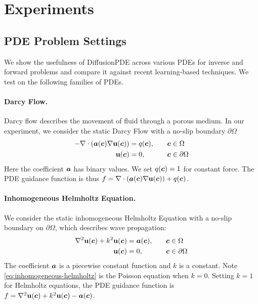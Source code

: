 \section{Experiments}


\subsection{PDE Problem Settings}
\label{sec:exp-forward-inverse}

We show the usefulness of DiffusionPDE across various PDEs for inverse and forward problems and compare it against recent learning-based techniques. We test on the following families of PDEs.

\vspace{-1em}\paragraph{Darcy Flow.} Darcy flow describes the movement of fluid through a porous medium. In our experiment, we consider the static Darcy Flow with a no-slip boundary $\partial\Omega$
\begin{equation}
    \begin{aligned}
        -\nabla\cdot(\boldsymbol{a}(\boldsymbol{c})\nabla \mathbf{u}(\boldsymbol{c}))&=q(\boldsymbol{c}),\quad && \boldsymbol{c}\in\Omega \\
        \mathbf{u}(\boldsymbol{c})&=0, && \boldsymbol{c}\in\partial\Omega
    \end{aligned}
\end{equation}
Here the coefficient $\boldsymbol{a}$ has binary values. We set $q(\boldsymbol{c}) = 1$ for constant force. The PDE guidance function is thus $f=\nabla\cdot(\boldsymbol{a}(\boldsymbol{c})\nabla \mathbf{u}(\boldsymbol{c}))+q(\boldsymbol{c})$.

\vspace{-1em}
\paragraph{Inhomogeneous Helmholtz Equation.} We consider the static inhomogeneous Helmholtz Equation with a no-slip boundary on $\partial\Omega$, which describes wave propagation:
\begin{equation}\label{eq:inhomogeneous-helmholtz}
    \begin{aligned}
        \nabla^2\mathbf{u}(\boldsymbol{c})+k^2\mathbf{u}(\boldsymbol{c})&=\boldsymbol{a}(\boldsymbol{c}),\quad && \boldsymbol{c}\in\Omega \\
        \mathbf{u}(\boldsymbol{c})&=0, && \boldsymbol{c}\in\partial\Omega
    \end{aligned}
\end{equation}
The coefficient $\boldsymbol{a}$ is a piecewise constant function and $k$ is a constant. Note \ref{eq:inhomogeneous-helmholtz} is the Poisson equation when $k=0$. 
Setting $k=1$ for Helmholtz equations, the PDE guidance function is $f = \nabla^2\mathbf{u}(\boldsymbol{c})+k^2\mathbf{u}(\boldsymbol{c})-\boldsymbol{a}(\boldsymbol{c})$. 


